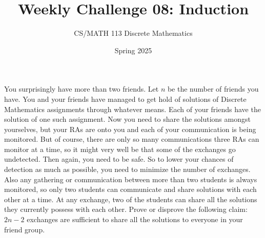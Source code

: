 \documentclass[a4paper]{exam}
\title{Weekly Challenge 08: Induction}
\author{CS/MATH 113 Discrete Mathematics}
\date{Spring 2025}
\begin{document}
\maketitle



\begin{questions}
     You surprisingly have more than two friends. Let $n$ be the number of friends you have. You and your friends have managed to get hold of solutions of Discrete Mathematics assignments through whatever means. Each of your friends have the solution of one such assignment. Now you need to share the solutions amongst yourselves, but your RAs are onto you and each of your communication is being monitored. But of course, there are only so many communications three RAs can monitor at a time, so it might very well be that some of the exchanges go undetected. Then again, you need to be safe. So to lower your chances of detection as much as possible, you need to minimize the number of exchanges. Also any gathering or communication between more than two students is always monitored, so only two students can communicate and share solutions with each other at a time. At any exchange, two of the students can share all the solutions they currently possess with each other. Prove or disprove the following claim: $2n-2$ exchanges are sufficient to share all the solutions to everyone in your friend group.



    \begin{figure}[!tbh]
        \centering
\end{figure}
\end{questions}
\end{document}
